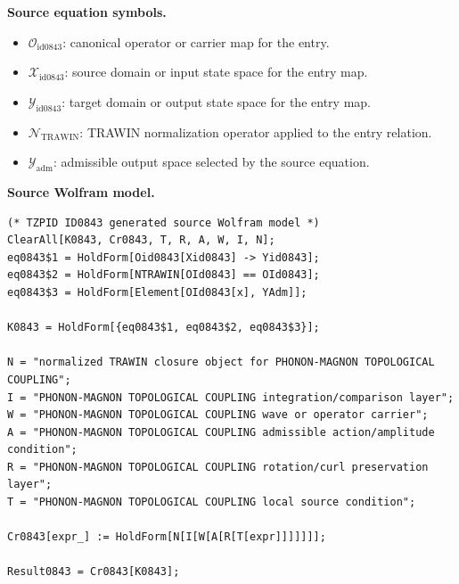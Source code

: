 \begin{minipage}[t]{0.49\linewidth}
\begingroup
\small
\raggedright
\textbf{Source equation symbols.}\par
\begin{itemize}[leftmargin=1.35em,itemsep=1pt,topsep=1pt,parsep=0pt]
    \item $\mathcal{O}_{\mathrm{id0843}}$: canonical operator or carrier map for the entry.
    \item $\mathcal{X}_{\mathrm{id0843}}$: source domain or input state space for the entry map.
    \item $\mathcal{Y}_{\mathrm{id0843}}$: target domain or output state space for the entry map.
    \item $\mathcal{N}_{\mathrm{TRAWIN}}$: TRAWIN normalization operator applied to the entry relation.
    \item $\mathcal{Y}_{\mathrm{adm}}$: admissible output space selected by the source equation.
\end{itemize}
\endgroup
\end{minipage}\hfill
\begin{minipage}[t]{0.47\linewidth}
\begingroup
\scriptsize
\raggedright
\textbf{Source Wolfram model.}\par
\begin{Verbatim}[fontsize=\tiny,breaklines=true,breakanywhere=true]
(* TZPID ID0843 generated source Wolfram model *)
ClearAll[K0843, Cr0843, T, R, A, W, I, N];
eq0843$1 = HoldForm[Oid0843[Xid0843] -> Yid0843];
eq0843$2 = HoldForm[NTRAWIN[OId0843] == OId0843];
eq0843$3 = HoldForm[Element[OId0843[x], YAdm]];

K0843 = HoldForm[{eq0843$1, eq0843$2, eq0843$3}];

N = "normalized TRAWIN closure object for PHONON-MAGNON TOPOLOGICAL COUPLING";
I = "PHONON-MAGNON TOPOLOGICAL COUPLING integration/comparison layer";
W = "PHONON-MAGNON TOPOLOGICAL COUPLING wave or operator carrier";
A = "PHONON-MAGNON TOPOLOGICAL COUPLING admissible action/amplitude condition";
R = "PHONON-MAGNON TOPOLOGICAL COUPLING rotation/curl preservation layer";
T = "PHONON-MAGNON TOPOLOGICAL COUPLING local source condition";

Cr0843[expr_] := HoldForm[N[I[W[A[R[T[expr]]]]]]];

Result0843 = Cr0843[K0843];
\end{Verbatim}
\endgroup
\end{minipage}

